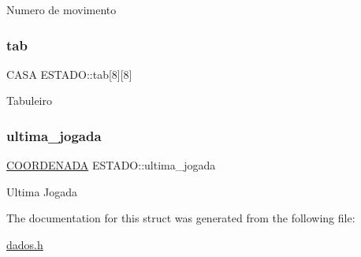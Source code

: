 Numero de movimento \mbox{\label{structESTADO_ab56f0f1be16954d3768b4174d14c087d}} 
\subsubsection{\texorpdfstring{tab}{tab}}
{\footnotesize\ttfamily C\+A\+SA E\+S\+T\+A\+D\+O\+::tab\mbox{[}8\mbox{]}\mbox{[}8\mbox{]}}

Tabuleiro \mbox{\label{structESTADO_a4896a5c5c1f40b43fb795623327e3f47}} 
\subsubsection{\texorpdfstring{ultima\+\_\+jogada}{ultima\_jogada}}
{\footnotesize\ttfamily \hyperlink{structCOORDENADA}{C\+O\+O\+R\+D\+E\+N\+A\+DA} E\+S\+T\+A\+D\+O\+::ultima\+\_\+jogada}

Ultima Jogada 

The documentation for this struct was generated from the following file\+:\begin{DoxyCompactItemize}
\item 
\hyperlink{dados_8h}{dados.\+h}\end{DoxyCompactItemize}

